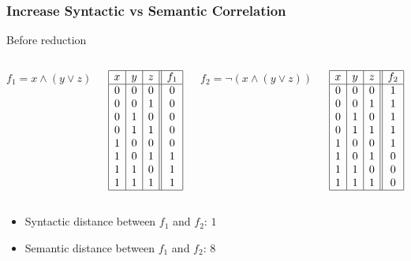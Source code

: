 \documentclass{beamer}
\newcommand{\AND}{\land}
\newcommand{\OR}{\lor}
\newcommand{\NOT}{\lnot}
\begin{document}
\frame
{
  \frametitle{Increase Syntactic vs Semantic Correlation}

  Before reduction

  \begin{columns}[c]
    \column{1.5in}

    $f_1 = x \AND (y \OR z)$

    \begin{table}
      {\small
      $
      \begin{array}{|c|c|c||c|}
        \hline
        x & y & z & f_1\\
        \hline
        0 & 0 & 0 & 0\\
        0 & 0 & 1 & 0\\
        0 & 1 & 0 & 0\\
        0 & 1 & 1 & 0\\
        1 & 0 & 0 & 0\\
        1 & 0 & 1 & 1\\
        1 & 1 & 0 & 1\\
        1 & 1 & 1 & 1\\
        \hline
      \end{array}
      $
      }
    \end{table}

    \column{1.5in}

    $f_2 =   \NOT (x \AND (y \OR z))$
    \begin{table}
      {\small
      $
      \begin{array}{|c|c|c||c|}
        \hline
        x & y & z & f_2\\
        \hline
        0 & 0 & 0 & 1\\
        0 & 0 & 1 & 1\\
        0 & 1 & 0 & 1\\
        0 & 1 & 1 & 1\\
        1 & 0 & 0 & 1\\
        1 & 0 & 1 & 0\\
        1 & 1 & 0 & 0\\
        1 & 1 & 1 & 0\\
        \hline
      \end{array}
      $
      }
    \end{table}
    
  \end{columns}

  \begin{itemize}
  \item Syntactic distance between $f_1$ and $f_2$: $1$
  \item Semantic distance between $f_1$ and $f_2$: $8$
  \end{itemize}
}
\end{document}

